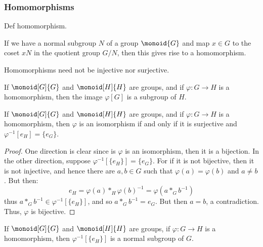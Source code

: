 \documentclass{article}                                                        %
\begin{document}
            \subsubsection{Homomorphisms}
                Def homomorphism.
                \begin{example}
                    If we have a normal subgroup $N$ of a group $\monoid{G}$ and
                    map $x\in{G}$ to the coset $xN$ in the quotient group
                    $G/N$, then this gives rise to a homomorphism.
                \end{example}
                Homomorphisms need not be injective nor surjective.
                \begin{theorem}
                    If $\monoid[G]{G}$ and $\monoid[H]{H}$ are groups, and if
                    $\varphi:G\rightarrow{H}$ is a homomorphism, then
                    the image $\varphi[G]$ is a subgroup of $H$.
                \end{theorem}
                \begin{theorem}
                    If $\monoid[G]{G}$ and $\monoid[H]{H}$ are groups, and if
                    $\varphi:G\rightarrow{H}$ is a homomorphism, then $\varphi$
                    is an isomorphism if and only if it is surjective and
                    $\varphi^{\minus{1}}[e_{H}]=\{e_{G}\}$.
                \end{theorem}
                \begin{proof}
                    One direction is clear since is $\varphi$ is an isomorphism,
                    then it is a bijection. In the other direction, suppose
                    $\varphi^{\minus{1}}[\{e_{H}\}]=\{e_{G}\}$. For if it is not
                    bijective, then it is not injective, and hence there are
                    $a,b\in{G}$ such that $\varphi(a)=\varphi(b)$ and $a\ne{b}$.
                    But then:
                    \begin{equation}
                        e_{H}=\varphi(a)*_{H}\varphi(b)^{\minus{1}}
                             =\varphi(a*_{G}b^{\minus{1}})
                    \end{equation}
                    thus $a*_{G}b^{\minus{1}}\in\varphi^{\minus{1}}[\{e_{H}\}]$,
                    and so $a*_{G}b^{\minus{1}}=e_{G}$. But then $a=b$, a
                    contradiction. Thus, $\varphi$ is bijective.
                \end{proof}
                \begin{theorem}
                    If $\monoid[G]{G}$ and $\monoid[H]{H}$ are groups, if
                    $\varphi:G\rightarrow{H}$ is a homomorphism, then
                    $\varphi^{\minus{1}}[\{e_{H}\}]$ is a normal subgroup of
                    $G$.
                \end{theorem}
\end{document}
